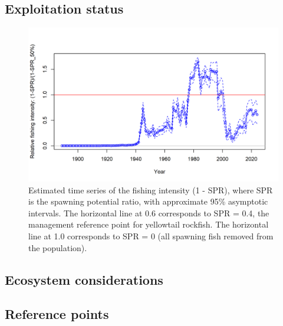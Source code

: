 \documentclass[
]{scrartcl}
\begin{document}
\clearpage

\hypertarget{exploitation-status}{%
\subsection*{Exploitation status}\label{exploitation-status}}



\begin{figure}

{\centering \includegraphics[width=6in,height=\textheight]{r4ss_plots/SPR3_ratiointerval.png}

}

\caption{\label{fig-es-spr}Estimated time series of the fishing
intensity (1 - SPR), where SPR is the spawning potential ratio, with
approximate 95\% asymptotic intervals. The horizontal line at 0.6
corresponds to SPR = 0.4, the management reference point for yellowtail
rockfish. The horizontal line at 1.0 corresponds to SPR = 0 (all
spawning fish removed from the population).}

\end{figure}

\clearpage

\hypertarget{ecosystem-considerations}{%
\subsection*{Ecosystem considerations}\label{ecosystem-considerations}}

\hypertarget{reference-points}{%
\subsection*{Reference points}\label{reference-points}}
\end{document}
